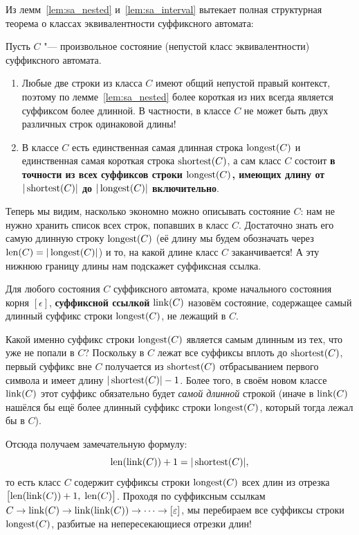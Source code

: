 Из лемм~\ref{lem:sa_nested} и~\ref{lem:sa_interval} вытекает полная структурная теорема о классах эквивалентности суффиксного автомата:

\begin{corollary}
    Пусть $C$ "--- произвольное состояние (непустой класс эквивалентности) суффиксного автомата.
    \begin{enumerate}
        \item Любые две строки из класса $C$ имеют общий непустой правый контекст, поэтому по лемме~\ref{lem:sa_nested} более короткая из них всегда является суффиксом более длинной. В частности, в классе $C$ не может быть двух различных строк одинаковой длины!
        \item В классе $C$ есть единственная самая длинная строка $\operatorname{longest}(C)$ и единственная самая короткая строка $\operatorname{shortest}(C)$, а сам класс $C$ состоит \textbf{в точности из всех суффиксов строки $\operatorname{longest}(C)$, имеющих длину от $|\operatorname{shortest}(C)|$ до $|\operatorname{longest}(C)|$ включительно}.
    \end{enumerate}
\end{corollary}

Теперь мы видим, насколько экономно можно описывать состояние $C$: нам не нужно хранить список всех строк, попавших в класс $C$. Достаточно знать его самую длинную строку $\operatorname{longest}(C)$ (её длину мы будем обозначать через $\operatorname{len}(C) = |\operatorname{longest}(C)|$) и то, на какой длине класс $C$ заканчивается! А эту нижнюю границу длины нам подскажет суффиксная ссылка.

\begin{definition}
    Для любого состояния $C$ суффиксного автомата, кроме начального состояния корня $[\epsilon]$, \textbf{суффиксной ссылкой} $\operatorname{link}(C)$ назовём состояние, содержащее самый длинный суффикс строки $\operatorname{longest}(C)$, не лежащий в $C$.
\end{definition}

Какой именно суффикс строки $\operatorname{longest}(C)$ является самым длинным из тех, что уже не попали в $C$? Поскольку в $C$ лежат все суффиксы вплоть до $\operatorname{shortest}(C)$, первый суффикс вне $C$ получается из $\operatorname{shortest}(C)$ отбрасыванием первого символа и имеет длину $|\operatorname{shortest}(C)| - 1$. Более того, в своём новом классе $\operatorname{link}(C)$ этот суффикс обязательно будет \emph{самой длинной} строкой (иначе в $\operatorname{link}(C)$ нашёлся бы ещё более длинный суффикс строки $\operatorname{longest}(C)$, который тогда лежал бы в $C$).

Отсюда получаем замечательную формулу:
\[
    \operatorname{len}(\operatorname{link}(C)) + 1 = |\operatorname{shortest}(C)|,
\]
то есть класс $C$ содержит суффиксы строки $\operatorname{longest}(C)$ всех длин из отрезка $\bigl[\operatorname{len}(\operatorname{link}(C)) + 1,\; \operatorname{len}(C)\bigr]$. Проходя по суффиксным ссылкам $C \to \operatorname{link}(C) \to \operatorname{link}(\operatorname{link}(C)) \to \dots \to [\varepsilon]$, мы перебираем все суффиксы строки $\operatorname{longest}(C)$, разбитые на непересекающиеся отрезки длин!

